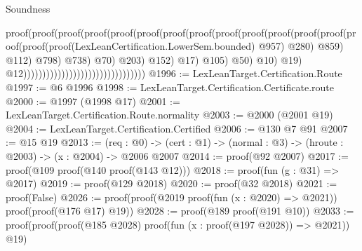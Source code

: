 \begin{lexlean}{Soundness}
\begin{coremodule}
                                                                                proof(proof(proof(proof(proof(proof(proof(proof(proof(proof(proof(proof(proof(proof(proof(proof(LexLeanCertification.LowerSem.bounded)
                                                                                                                @957)
                                                                                                              @280)
                                                                                                            @859)
                                                                                                          @112)
                                                                                                        @798)
                                                                                                      @738)
                                                                                                    @70)
                                                                                                  @203)
                                                                                                @152)
                                                                                              @17)
                                                                                            @105)
                                                                                          @50)
                                                                                        @10)
                                                                                      @19)
                                                                                    @12))))))))))))))))))))))))))))))))
@1996 := LexLeanTarget.Certification.Route
@1997 := @6 @1996
@1998 := LexLeanTarget.Certification.Certificate.route
@2000 := @1997 (@1998 @17)
@2001 := LexLeanTarget.Certification.Route.normality
@2003 := @2000 (@2001 @19)
@2004 := LexLeanTarget.Certification.Certified
@2006 := @130 @7 @91
@2007 := @15 @19
@2013 := (req : @0) ->
  (cert : @1) -> (normal : @3) -> (hroute : @2003) -> (x : @2004) -> @2006 @2007
@2014 := proof(@92 @2007)
@2017 := proof(@109 proof(@140 proof(@143 @12)))
@2018 := proof(fun (g : @31) => @2017)
@2019 := proof(@129 @2018)
@2020 := proof(@32 @2018)
@2021 := proof(False)
@2026 := proof(proof(@2019 proof(fun (x : @2020) => @2021)) proof(proof(@176 @17) @19))
@2028 := proof(@189 proof(@191 @10))
@2033 := proof(proof(proof(@185 @2028) proof(fun (x : proof(@197 @2028)) => @2021)) @19)

\end{coremodule}
\end{lexlean}
